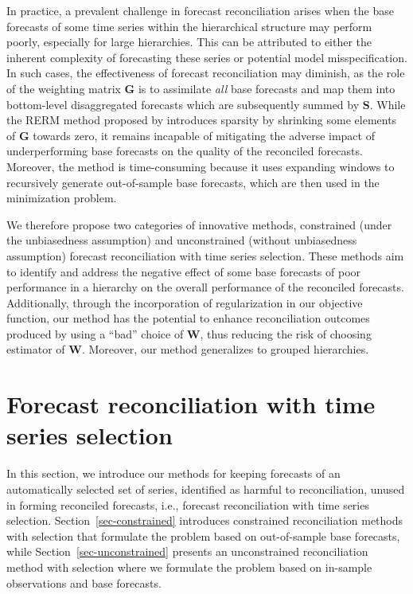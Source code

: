 \documentclass[11pt,a4paper,]{article}
\begin{document}
In practice, a prevalent challenge in forecast reconciliation arises
when the base forecasts of some time series within the hierarchical
structure may perform poorly, especially for large hierarchies. This can
be attributed to either the inherent complexity of forecasting these
series or potential model misspecification. In such cases, the
effectiveness of forecast reconciliation may diminish, as the role of
the weighting matrix \(\boldsymbol{G}\) is to assimilate \emph{all} base
forecasts and map them into bottom-level disaggregated forecasts which
are subsequently summed by \(\boldsymbol{S}\). While the RERM method
proposed by \textcite{Ben_Taieb2019-be} introduces sparsity by shrinking
some elements of \(\boldsymbol{G}\) towards zero, it remains incapable
of mitigating the adverse impact of underperforming base forecasts on
the quality of the reconciled forecasts. Moreover, the method is
time-consuming because it uses expanding windows to recursively generate
out-of-sample base forecasts, which are then used in the minimization
problem.

We therefore propose two categories of innovative methods, constrained
(under the unbiasedness assumption) and unconstrained (without
unbiasedness assumption) forecast reconciliation with time series
selection. These methods aim to identify and address the negative effect
of some base forecasts of poor performance in a hierarchy on the overall
performance of the reconciled forecasts. Additionally, through the
incorporation of regularization in our objective function, our method
has the potential to enhance reconciliation outcomes produced by using a
``bad'' choice of \(\boldsymbol{W}\), thus reducing the risk of choosing
estimator of \(\boldsymbol{W}\). Moreover, our method generalizes to
grouped hierarchies.

\hypertarget{sec-methodology}{%
\section{Forecast reconciliation with time series
selection}\label{sec-methodology}}

In this section, we introduce our methods for keeping forecasts of an
automatically selected set of series, identified as harmful to
reconciliation, unused in forming reconciled forecasts, i.e., forecast
reconciliation with time series selection. Section~\ref{sec-constrained}
introduces constrained reconciliation methods with selection that
formulate the problem based on out-of-sample base forecasts, while
Section~\ref{sec-unconstrained} presents an unconstrained reconciliation
method with selection where we formulate the problem based on in-sample
observations and base forecasts.
\end{document}
